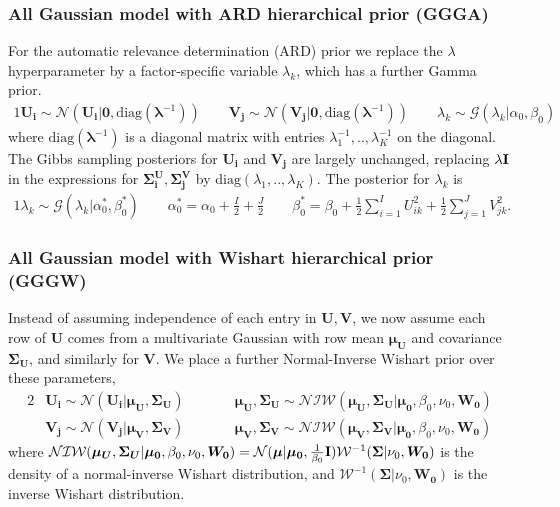 \documentclass{article}
\newcommand{\U}{\boldsymbol U}
\newcommand{\Ui}{\boldsymbol{U_i}}
\newcommand{\V}{\boldsymbol V}
\newcommand{\Vj}{\boldsymbol{V_j}}
\newcommand{\SigmaUi}{\boldsymbol{\Sigma^U_i}}
\newcommand{\SigmaVj}{\boldsymbol{\Sigma^V_j}}
\begin{document}
		\subsubsection{All Gaussian model with ARD hierarchical prior (GGGA)}
		For the automatic relevance determination (ARD) prior we replace the $\lambda$ hyperparameter by a factor-specific variable $\lambda_k$, which has a further Gamma prior. 
		\begin{alignat*}{1}
			\Ui \sim \mathcal{N} ( \Ui | \boldsymbol 0, \text{diag}(\boldsymbol \lambda^{-1}) )		\quad\quad	\Vj \sim \mathcal{N} ( \Vj | \boldsymbol 0, \text{diag}(\boldsymbol \lambda^{-1}) ) 	\quad\quad 		\lambda_k \sim \mathcal{G} (\lambda_k | \alpha_0, \beta_0 )
		\end{alignat*}
		where $\text{diag}(\boldsymbol \lambda^{-1})$ is a diagonal matrix with entries $\lambda_1^{-1}, .., \lambda_K^{-1}$ on the diagonal.
		The Gibbs sampling posteriors for $\Ui$ and $\Vj$ are largely unchanged, replacing $\lambda \text{\textbf I}$ in the expressions for $\SigmaUi, \SigmaVj$ by $\text{diag}(\lambda_1,..,\lambda_K)$. The posterior for $\lambda_k$ is
		\begin{alignat*}{1}
			\lambda_k \sim \mathcal{G} (\lambda_k | \alpha^*_0, \beta^*_0 )		\quad\quad 		\alpha^*_0 = \alpha_0 + \frac{I}{2} + \frac{J}{2} 		\quad\quad  		\beta^*_0 = \beta_0 + \frac{1}{2} \sum_{i=1}^I U_{ik}^2 + \frac{1}{2} \sum_{j=1}^J V_{jk}^2.
		\end{alignat*}
		
		\subsubsection{All Gaussian model with Wishart hierarchical prior (GGGW)}
		Instead of assuming independence of each entry in $\U, \V$, we now assume each row of $\U$ comes from a multivariate Gaussian with row mean $\boldsymbol{\mu_U}$ and covariance $\boldsymbol{\Sigma_U}$, and similarly for $\V$. We place a further Normal-Inverse Wishart prior over these parameters,
		\begin{alignat*}{2}
			&\Ui \sim \mathcal{N} ( \Ui | \boldsymbol{\mu_U}, \boldsymbol{\Sigma_U})		\quad\quad	&&\boldsymbol{\mu_U}, \boldsymbol{\Sigma_U} \sim \mathcal{NIW} ( \boldsymbol{\mu_U}, \boldsymbol{\Sigma_U} | \boldsymbol{\mu_0}, \beta_0, \nu_0, \boldsymbol{W_0} ) \\
			&\Vj \sim \mathcal{N} ( \Vj | \boldsymbol{\mu_V}, \boldsymbol{\Sigma_V})		\quad\quad 		&&\boldsymbol{\mu_V}, \boldsymbol{\Sigma_V} \sim \mathcal{NIW} ( \boldsymbol{\mu_V}, \boldsymbol{\Sigma_V} | \boldsymbol{\mu_0}, \beta_0, \nu_0, \boldsymbol{W_0} )
		\end{alignat*}
		where $ \mathcal{NIW} ( \boldsymbol{\mu_U}, \boldsymbol{\Sigma_U} | \boldsymbol{\mu_0}, \beta_0, \nu_0, \boldsymbol{W_0} ) = \mathcal{N}(\boldsymbol \mu | \boldsymbol{\mu_0}, \frac{1}{\beta_0} \text{\textbf I} ) \mathcal{W}^{-1} ( \boldsymbol \Sigma | \nu_0, \boldsymbol{W_0} ) $ is the density of a normal-inverse Wishart distribution, and $\mathcal{W}^{-1} ( \boldsymbol \Sigma | \nu_0, \boldsymbol{W_0} )$ is the inverse Wishart distribution. 
		
\end{document}
